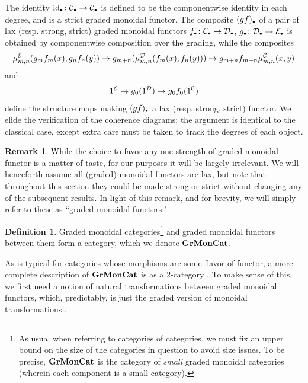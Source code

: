 \documentclass[openany, amssymb, psamsfonts]{amsart}
\theoremstyle{definition}
\newtheorem{defn}{Definition}[section]
\newtheorem{rem}{Remark}[section]
\numberwithin{equation}{section}
\begin{document}
The identity $\mathrm{id}_\sbull \colon \C_\sbull \to \C_\sbull$ is defined to be the componentwise identity in each degree, and is a strict graded monoidal functor. The composite $(gf)_\sbull$ of a pair of lax (resp. strong, strict) graded monoidal functors $f_\sbull \colon \C_\sbull \to \D_\sbull$, $g_\sbull \colon \D_\sbull \to \E_\sbull$ is obtained by componentwise composition over the grading, while the composites
$$
\mu^{\mathcal{E}}_{m,n}(g_mf_m(x), g_nf_n(y)) \to g_{m+n}(\mu^{\mathcal{D}}_{m,n}(f_m(x), f_n(y))) \to g_{m+n}f_{m+n}\mu_{m,n}^{\mathcal{C}}(x, y)
$$
and
$$
1^{\mathcal{E}} \to g_0(1^{\mathcal{D}}) \to g_0f_0(1^{\mathcal{C}})
$$
define the structure maps making $(gf)_\sbull$ a lax (resp. strong, strict) functor. We elide the verification of the coherence diagrams; the argument is identical to the classical case, except extra care must be taken to track the degrees of each object.

\begin{rem}
While the choice to favor any one strength of graded monoidal functor is a matter of taste, for our purposes it will be largely irrelevant. We will henceforth assume all (graded) monoidal functors are lax, but note that throughout this section they could be made strong or strict without changing any of the subsequent results. In light of this remark, and for brevity, we will simply refer to these as ``graded monoidal functors."
\end{rem}

\begin{defn}
Graded monoidal categories\footnote{As usual when referring to categories of categories, we must fix an upper bound on the size of the categories in question to avoid size issues. To be precise, $\textbf{\textup{GrMonCat}}$ is the category of \emph{small} graded monoidal categories (wherein each component is a small category).} and graded monoidal functors between them form a category, which we denote $\textbf{\textup{GrMonCat}}$.
\end{defn}

As is typical for categories whose morphisms are some flavor of functor, a more complete description of $\textbf{\textup{GrMonCat}}$ is as a 2-category \cite[Section XII.3]{maclane}. To make sense of this, we first need a notion of natural transformations between graded monoidal functors, which, predictably, is just the graded version of monoidal transformations \cite[Chapter XI]{maclane}.
\end{document}
